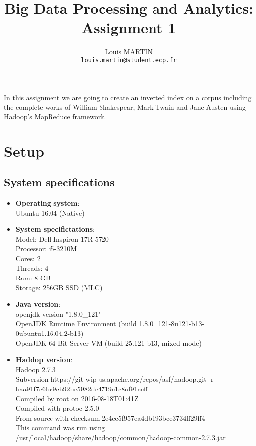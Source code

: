 \documentclass[a4paper,12pt]{article}
\begin{document}
\title{Big Data Processing and Analytics: Assignment 1}
\author{Louis MARTIN\\
\href{mailto:louis.martin@student.ecp.fr}{\tt louis.martin@student.ecp.fr}}

\maketitle

In this assignment we are going to create an inverted index on a corpus
including the complete works of William Shakespear, Mark Twain and Jane Austen
using Hadoop's MapReduce framework.

\section{Setup}
\subsection{System specifications}

\begin{itemize}
    \item \textbf{Operating system}:\\
    Ubuntu 16.04 (Native)
    \item \textbf{System specifictations}:\\
    Model: Dell Inspiron 17R 5720\\
    Processor: i5-3210M\\
    Cores: 2\\
    Threads: 4\\
    Ram: 8 GB\\
    Storage: 256GB SSD (MLC)
    \item \textbf{Java version}:\\
    openjdk version "1.8.0\_121"\\
    OpenJDK Runtime Environment (build 1.8.0\_121-8u121-b13-0ubuntu1.16.04.2-b13)\\
    OpenJDK 64-Bit Server VM (build 25.121-b13, mixed mode)
    \item \textbf{Haddop version}:\\
    Hadoop 2.7.3\\
    Subversion https://git-wip-us.apache.org/repos/asf/hadoop.git -r baa91f7c6bc9cb92be5982de4719c1c8af91ccff\\
    Compiled by root on 2016-08-18T01:41Z\\
    Compiled with protoc 2.5.0\\
    From source with checksum 2e4ce5f957ea4db193bce3734ff29ff4\\
    This command was run using /usr/local/hadoop/share/hadoop/common/hadoop-common-2.7.3.jar\\

\end{itemize}
\end{document}
